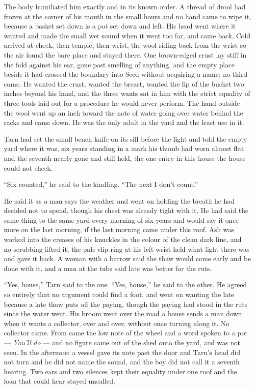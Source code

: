 The body humiliated him exactly and in its known order. A thread of drool had frozen at the corner of his mouth in the small hours and no hand came to wipe it, because a basket set down is a pot set down and left. His head went where it wanted and made the small wet sound when it went too far, and came back. Cold arrived at cheek, then temple, then wrist, the wool riding back from the wrist so the air found the bare place and stayed there. One brown-edged crust lay stiff in the fold against his ear, gone past smelling of anything, and the empty place beside it had crossed the boundary into Seed without acquiring a name; no third came. He wanted the crust, wanted the breast, wanted the lip of the bucket two inches beyond his hand, and the three wants sat in him with the strict equality of three tools laid out for a procedure he would never perform. The hand outside the wool went up an inch toward the note of water going over water behind the racks and came down. He was the only adult in the yard and the least use in it.

Tarn had set the small bench knife on its sill before the light and told the empty yard where it was, six years standing in a mark his thumb had worn almost flat and the seventh nearly gone and still held, the one entry in this house the house could not check.

“Six counted,” he said to the kindling. “The next I don't count.”

He said it as a man says the weather and went on holding the breath he had decided not to spend, though his chest was already tight with it. He had said the same thing to the same yard every morning of six years and would say it once more on the last morning, if the last morning came under this roof. Ash was worked into the creases of his knuckles in the colour of the clean dark line, and no scrubbing lifted it; the pale clip-ring at his left wrist held what light there was and gave it back. A woman with a barrow said the thaw would come early and be done with it, and a man at the tubs said late was better for the ruts.

“Yes, house,” Tarn said to the one. “Yes, house,” he said to the other. He agreed so entirely that no argument could find a foot, and went on wanting the late because a late thaw puts off the paying, though the paying had stood in the ruts since the water went. His broom went over the road a house sends a man down when it wants a collector, over and over, without once turning along it. No collector came. From  came the low note of the wheel and a word spoken to a pot --- \emph{You'll do} --- and no figure came out of the shed onto the yard, and  was not seen. In the afternoon a vessel gave its note past the door and Tarn's head did not turn and he did not name the sound, and the boy did not call it a seventh hearing. Two ears and two silences kept their equality under one roof and the loan that could hear stayed uncalled.

